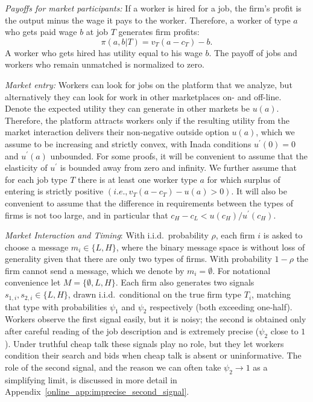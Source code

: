 \documentclass[12pt]{article}
\begin{document}
\textit{Payoffs for market participants:} If a worker is hired for a job, the firm's profit is the output
minus the wage it pays to the worker. Therefore, a worker of type $a$ who
gets paid wage $b$ at job $T$ generates firm profits:%
\begin{equation}
\pi (a,b|T)=v_{T}(a-c_{T})-b.  \label{firm-profit}
\end{equation}%
A worker who gets hired has utility equal to his wage $b$. The payoff of jobs
and workers who remain unmatched is normalized to zero.

\textit{Market entry:} Workers can look for jobs on the platform that we analyze, but alternatively they can look for work in other marketplaces on- and off-line. Denote the expected utility they can generate in other markets be $u(a)$. Therefore, the platform attracts workers only if the resulting utility from the market interaction delivers their non-negative outside option $u(a)$,
which we assume to be increasing and strictly convex, with Inada conditions $%
u^{\prime }(0)=0$ and $u^{\prime }(a)$ unbounded. For some proofs, it will be
convenient to assume that the elasticity of $u^{\prime }$ is bounded away
from zero and infinity. We further assume that for each job type $T$ there is at least one worker type $%
a$ for which surplus of entering is strictly positive $%
(i.e.,v_{T}(a-c_{T})-u\left( a\right) >0).$ It will also be convenient to
assume that the difference in requirements between the types of firms is not
too large, and in particular that $c_{H}-c_{L}<u(c_{H})/u^{\prime }(c_{H}).$


\textit{Market Interaction and Timing}: With i.i.d.\ probability $\rho$, each firm $i$ is asked to choose a message $m_{i}\in\{L,H\}$, where the binary message space is without loss of generality given that there are only two types of firms. With probability $1-\rho$ the firm cannot send a message, which we denote by $m_{i}=\emptyset$. For notational convenience let $M=\{\emptyset,L,H\}$. Each firm also generates two signals $s_{1,i},s_{2,i}\in\{L,H\}$, drawn i.i.d.\ conditional on the true firm type $T_{i}$, matching that type with probabilities $\psi_{1}$ and $\psi_{2}$ respectively (both exceeding one-half). Workers observe the first signal easily, but it is noisy; the second is obtained only after careful reading of the job description and is extremely precise ($\psi_{2}$ close to $1$). Under truthful cheap talk these signals play no role, but they let workers condition their search and bids when cheap talk is absent or uninformative. The role of the second signal, and the reason we can often take $\psi_{2}\to 1$ as a simplifying limit, is discussed in more detail in Appendix~\ref{online_app:imprecise_second_signal}.
\end{document}

